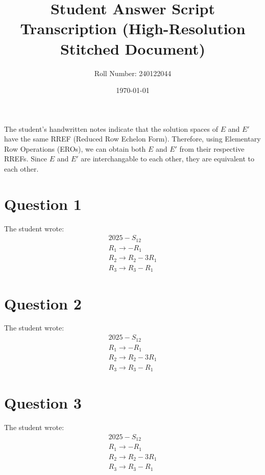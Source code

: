 \documentclass[12pt]{article}
\title{Student Answer Script Transcription (High-Resolution Stitched Document)}
\author{Roll Number: 240122044}
\date{\today}
\begin{document}
\maketitle

The student's handwritten notes indicate that the solution spaces of \(E\) and \(E'\) have the same RREF (Reduced Row Echelon Form). Therefore, using Elementary Row Operations (EROs), we can obtain both \(E\) and \(E'\) from their respective RREFs. Since \(E\) and \(E'\) are interchangable to each other, they are equivalent to each other.

\section*{Question 1}
The student wrote:
\[
\begin{array}{l}
2025-S_{12} \\
R_{1} \rightarrow -R_{1} \\
R_{2} \rightarrow R_{2}-3R_{1} \\
R_{3} \rightarrow R_{3}-R_{1}
\end{array}
\]

\section*{Question 2}
The student wrote:
\[
\begin{array}{l}
2025-S_{12} \\
R_{1} \rightarrow -R_{1} \\
R_{2} \rightarrow R_{2}-3R_{1} \\
R_{3} \rightarrow R_{3}-R_{1}
\end{array}
\]

\section*{Question 3}
The student wrote:
\[
\begin{array}{l}
2025-S_{12} \\
R_{1} \rightarrow -R_{1} \\
R_{2} \rightarrow R_{2}-3R_{1} \\
R_{3} \rightarrow R_{3}-R_{1}
\end{array}
\]
\end{document}
